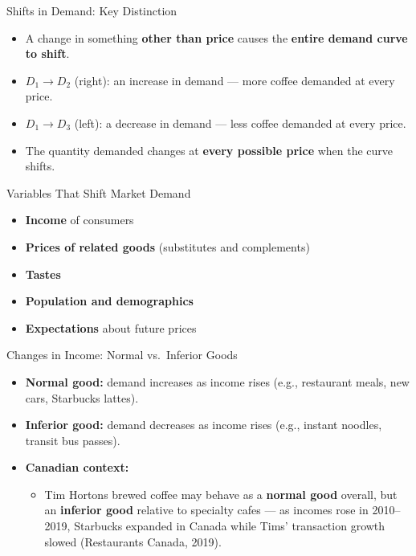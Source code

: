 \documentclass[aspectratio=169]{beamer}
\begin{document}
\begin{frame}{Shifts in Demand: Key Distinction}
\transfade
\begin{itemize}
  \item A change in something \textbf{other than price} causes the \textbf{entire demand curve to shift}.
  \item $D_1 \to D_2$ (right): an \alert{increase in demand} --- more coffee demanded at every price.
  \item $D_1 \to D_3$ (left): a \alert{decrease in demand} --- less coffee demanded at every price.
  \item The quantity demanded changes at \textbf{every possible price} when the curve shifts.
\end{itemize}
\end{frame}

\begin{frame}{Variables That Shift Market Demand}
\transfade
\begin{itemize}
  \item \textbf{Income} of consumers
  \item \textbf{Prices of related goods} (substitutes and complements)
  \item \textbf{Tastes}
  \item \textbf{Population and demographics}
  \item \textbf{Expectations} about future prices
\end{itemize}
\end{frame}

\begin{frame}{Changes in Income: Normal vs.\ Inferior Goods}
\transfade
\begin{itemize}
  \item \textbf{Normal good:} demand increases as income rises (e.g., restaurant meals, new cars, Starbucks lattes).
  \item \textbf{Inferior good:} demand decreases as income rises (e.g., instant noodles, transit bus passes).
  \item \textbf{Canadian context:}
  \begin{itemize}
    \item Tim Hortons brewed coffee may behave as a \textbf{normal good} overall, but an \textbf{inferior good} relative to specialty cafes --- as incomes rose in 2010--2019, Starbucks expanded in Canada while Tims' transaction growth slowed (Restaurants Canada, 2019).
  \end{itemize}
\end{itemize}
\end{frame}
\end{document}
